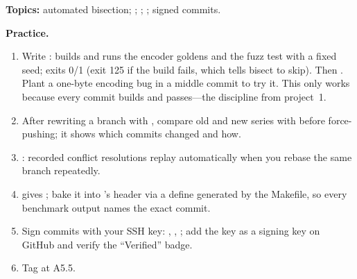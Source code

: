 \begin{gitbox}
\textbf{Topics:} automated bisection; ; ; ; signed commits.

\textbf{Practice.}
\begin{enumerate}
  \item Write : builds and runs the encoder goldens and the fuzz test with a fixed seed; exits 0/1 (exit 125 if the build fails, which tells bisect to skip). Then . Plant a one-byte encoding bug in a middle commit to try it. This only works because every commit builds and passes---the discipline from project~1.
  \item After rewriting a branch with , compare old and new series with  before force-pushing; it shows which commits changed and how.
  \item {}: recorded conflict resolutions replay automatically when you rebase the same branch repeatedly.
  \item {} gives ; bake it into 's header via a  define generated by the Makefile, so every benchmark output names the exact commit.
  \item Sign commits with your SSH key: , , ; add the key as a signing key on GitHub and verify the ``Verified'' badge.
  \item Tag  at A5.5.
\end{enumerate}
\end{gitbox}
